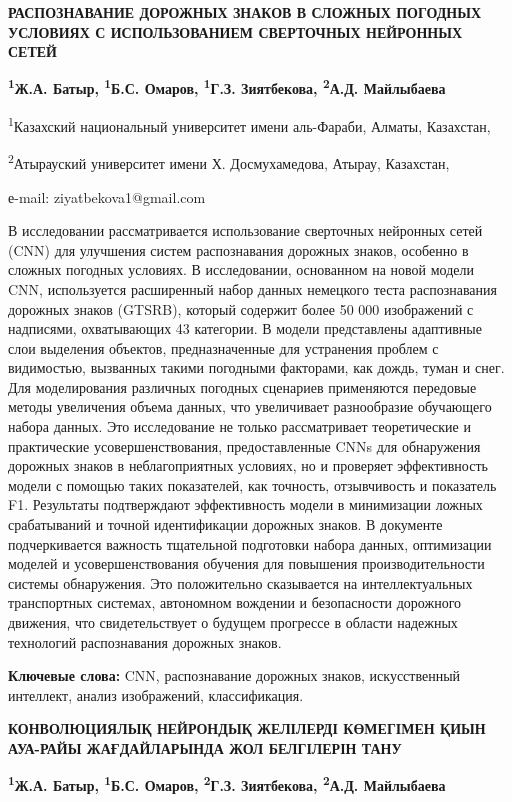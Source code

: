 {\bfseries РАСПОЗНАВАНИЕ ДОРОЖНЫХ ЗНАКОВ В СЛОЖНЫХ ПОГОДНЫХ УСЛОВИЯХ С
ИСПОЛЬЗОВАНИЕМ СВЕРТОЧНЫХ НЕЙРОННЫХ СЕТЕЙ}

{\bfseries \textsuperscript{1}Ж.А. Батыр, \textsuperscript{1}Б.С. Омаров,
\textsuperscript{1}Г.З. Зиятбекова, \textsuperscript{2}А.Д. Майлыбаева}

\textsuperscript{1}Казахский национальный университет имени аль-Фараби,
Алматы, Казахстан,

\textsuperscript{2}Атырауский университет имени Х. Досмухамедова,
Атырау, Казахстан,

е-mail: ziyatbekova1@gmail.com

В исследовании рассматривается использование сверточных нейронных сетей
(CNN) для улучшения систем распознавания дорожных знаков, особенно в
сложных погодных условиях. В исследовании, основанном на новой модели
CNN, используется расширенный набор данных немецкого теста распознавания
дорожных знаков (GTSRB), который содержит более 50 000 изображений с
надписями, охватывающих 43 категории. В модели представлены адаптивные
слои выделения объектов, предназначенные для устранения проблем с
видимостью, вызванных такими погодными факторами, как дождь, туман и
снег. Для моделирования различных погодных сценариев применяются
передовые методы увеличения объема данных, что увеличивает разнообразие
обучающего набора данных. Это исследование не только рассматривает
теоретические и практические усовершенствования, предоставленные CNNs
для обнаружения дорожных знаков в неблагоприятных условиях, но и
проверяет эффективность модели с помощью таких показателей, как
точность, отзывчивость и показатель F1. Результаты подтверждают
эффективность модели в минимизации ложных срабатываний и точной
идентификации дорожных знаков. В документе подчеркивается важность
тщательной подготовки набора данных, оптимизации моделей и
усовершенствования обучения для повышения производительности системы
обнаружения. Это положительно сказывается на интеллектуальных
транспортных системах, автономном вождении и безопасности дорожного
движения, что свидетельствует о будущем прогрессе в области надежных
технологий распознавания дорожных знаков.

{\bfseries Ключевые слова:} CNN, распознавание дорожных знаков,
искусственный интеллект, анализ изображений, классификация.

{\bfseries КОНВОЛЮЦИЯЛЫҚ НЕЙРОНДЫҚ ЖЕЛІЛЕРДІ КӨМЕГІМЕН ҚИЫН АУА-РАЙЫ
ЖАҒДАЙЛАРЫНДА ЖОЛ БЕЛГІЛЕРІН ТАНУ}

{\bfseries \textsuperscript{1}Ж.А. Батыр, \textsuperscript{1}Б.С. Омаров,
\textsuperscript{2}Г.З. Зиятбекова, \textsuperscript{2}А.Д. Майлыбаева}


